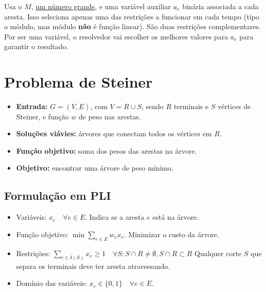 Usa o $M$, \underline{um número grande}, e uma variável auxiliar $a_e$ binária associada a cada aresta. Isso seleciona apenas uma das restrições a funcionar em cada tempo (tipo o módulo, mas módulo \textbf{não} é função linear). São duas restrições complementares. Por ser uma variável, o resolvedor vai escolher os melhores valores para $a_e$ para garantir o resultado.

\section{Problema de Steiner}

\begin{itemize}
    \item \textbf{Entrada:} $G = (V, E)$, com $V = R \cup S$, sendo $R$ terminais e $S$ vértices de Steiner, e função $w$ de peso nas arestas.
    \item \textbf{Soluções viávies:} árvores que conectam todos os vértices em $R$.
    \item \textbf{Função objetivo:} soma dos pesos das arestas na árvore.
    \item \textbf{Objetivo:} encontrar uma árvore de peso mínimo.
\end{itemize}

\subsection{Formulação em PLI}

\begin{itemize}
    \item Variáveis: $x_e \quad \forall e \in E$. Indica se a aresta $e$ está na árvore.
    \item Função objetivo: $\min\sum_{e \in E}w_ex_e$. Minimizar o custo da árvore.
    \item Restrições: $\sum_{e \in \delta(S)} x_e\geq 1\quad \forall S:S\cap R \neq\emptyset, S\cap R \subset R$ Qualquer corte $S$ que separa os terminais deve ter aresta atravessando.
    \item Domínio das variáveis: $x_e \in \{0,1\} \quad \forall e \in E$.
\end{itemize}